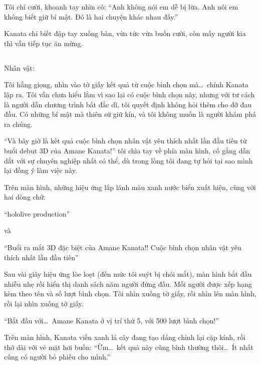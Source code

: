 \documentclass[../main.tex]{subfiles}
\begin{document}
Tôi chỉ cười, khoanh tay nhìn cô: ``Anh không nói em dễ bị lừa. Anh nói em không biết giữ bí mật. Đó là hai chuyện khác nhau đấy.''

Kanata chỉ biết đập tay xuống bàn, vừa tức vừa buồn cười, còn mấy người kia thì vẫn tiếp tục ăn mừng.

\newpage

\subsection*{\label{ep-S7.V}}
\vspace{-4pt}
\begin{center}
  {\caviar\fontsize{12pt}{12pt}\selectfont Nhân vật:  }
\end{center}

Tôi hắng giọng, nhìn vào tờ giấy kết quả từ cuộc bình chọn mà\dots\ chính Kanata lập ra. Tôi vẫn chưa hiểu lắm vì sao lại có cuộc bình chọn này, nhưng với tư cách là người dẫn chương trình bất đắc dĩ, tôi quyết định không hỏi thêm cho đỡ đau đầu. Có những bí mật mà thiên sứ giữ kín, và tôi không muốn là người khám phá ra chúng.

``Và bây giờ là kết quả cuộc bình chọn nhân vật yêu thích nhất lần đầu tiên từ buổi debut 3D của Amane Kanata!''  tôi chìa tay về phía màn hình, cố gắng dẫn dắt với sự chuyên nghiệp nhất có thể, dù trong lòng tôi đang tự hỏi tại sao mình lại đồng ý làm việc này.

Trên màn hình, những hiệu ứng lấp lánh màu xanh nước biển xuất hiện, cùng với hai dòng chữ:

\begin{center}
  ``hololive production''
\end{center}
và
\begin{center}
  ``Buổi ra mắt 3D đặc biệt của Amane Kanata!!
  Cuộc bình chọn nhân vật yêu thích nhất lần đầu tiên''
\end{center}

Sau vài giây hiệu ứng lòe loẹt (đến mức tôi suýt bị chói mắt), màn hình bắt đầu nhiễu nhẹ rồi hiển thị danh sách năm người đứng đầu. Mỗi người được xếp hạng kèm theo tên và số lượt bình chọn. Tôi nhìn xuống tờ giấy, rồi nhìn lên màn hình, rồi lại nhìn xuống tờ giấy.

``Bắt đầu với\dots\ Amane Kanata ở vị trí thứ 5, với 500 lượt bình chọn!''

Trên màn hình, Kanata viền xanh lá cây đang tạo dáng chỉnh lại cặp kính, rồi thở dài với vẻ mặt hơi buồn: ``Ừm\dots\ kết quả này cũng bình thường thôi\dots\ Ít nhất cũng có người bỏ phiếu cho mình.''
\end{document}
